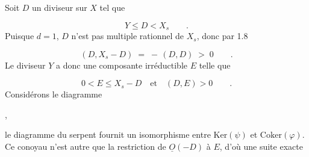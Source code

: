 Soit $D$ un diviseur sur $X$ tel que

\begin{equation*}
Y \leq D < X_s \qquad .
\end{equation*}
Puisque $d = 1$, $D$ n'est pas multiple rationnel de $X_s$, donc par 1.8

\begin{equation*}
(D,X_s-D) \;=\; - \,(D,D) \;>\; 0 \qquad .
\end{equation*}
Le diviseur $Y$ a donc une composante irréductible $E$ telle que

\begin{equation*}
0 < E \leq X_s-D \quad \text{et} \quad (D,E) > 0 \qquad .
\end{equation*}
Considérons le diagramme

\begin{center}
\qquad ,
\end{center}
le diagramme du serpent fournit un isomorphisme entre $\mathrm{Ker}(\psi)$ et $\mathrm{Coker}(\varphi)$. Ce conoyau n'est autre que la restriction de $\underline{O}(-D)$ à $E$, d'où une suite exacte

